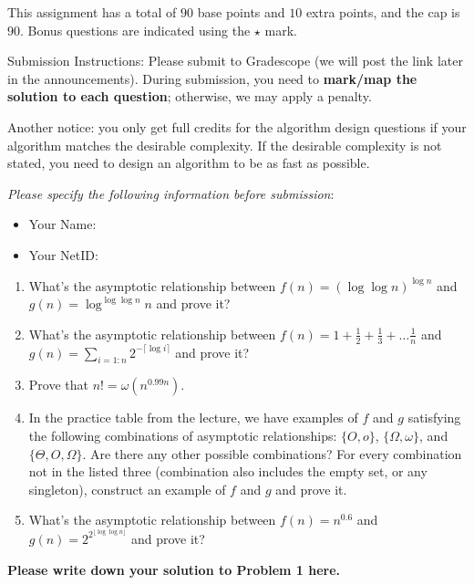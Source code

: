 \documentclass[letterpaper, 11pt]{article}
\newcommand{\1}{\mathds{1}}	%
\theoremstyle{definition}
\begin{document}

This assignment has a total of $90$ base points and $10$ extra points, and the cap is $90$.
Bonus questions are indicated using the $\star$ mark.

Submission Instructions: Please submit to Gradescope (we will post the link later in the announcements). During submission, you need to \textbf{mark/map the solution to each question}; otherwise, we may apply a penalty. 

Another notice: you only get full credits for the algorithm design questions if your algorithm matches the desirable complexity. If the desirable complexity is not stated, you need to design an algorithm to be as fast as possible.

\textit{Please specify the following information before submission}:
\begin{itemize}
    \item Your Name: %
    \item Your NetID: %
\end{itemize}



\begin{enumerate}
\item What's the asymptotic relationship between $f(n) = (\log\log n)^{\log n}$ and $g(n) = \log^{\log\log n}n$ and prove it?
\item What's the asymptotic relationship between $f(n) = 1 + \frac{1}{2} + \frac{1}{3} + \ldots \frac{1}{n}$ and $g(n) = \sum_{i=1:n} 2^{-\lceil\log i \rceil}$ and prove it?
\item Prove that $n! = \omega(n^{0.99n})$.

\item In the practice table from the lecture, we have examples of $f$ and $g$ satisfying the following combinations of asymptotic relationships: $\{O, o\}$, $\{\Omega, \omega\}$, and $\{\Theta, O, \Omega\}$. Are there any other possible combinations? For every combination not in the listed three (combination also includes the empty set, or any singleton), construct an example of $f$ and $g$ and prove it.

\item What's the asymptotic relationship between $f(n)=n^{0.6}$ and $g(n) = 2^{2^{\lfloor \log\log n \rfloor}}$ and prove it?

\end{enumerate}
\begin{solution}
\textbf{Please write down your solution to Problem 1 here.}
\end{solution}
\end{document}
